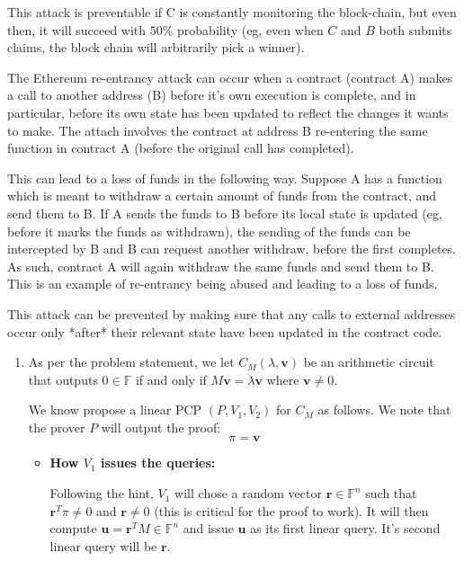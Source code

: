 \documentclass[12pt]{exam}
\newcommand{\Q}[1]{\question{\large{\textbf{#1}}}}
\begin{document}
\begin{questions}
\begin{solution}
  This attack is preventable if C is constantly monitoring the block-chain, but even then, it will succeed with $50\%$ probability (eg, even when $C$ and $B$ both submits claims, the block chain will arbitrarily pick a winner).
\end{solution}

\newpage
\Q{Problem 3}
\begin{solution}
  The Ethereum re-entrancy attack can occur when a contract (contract A) makes a call to another address (B) before it's own execution is complete, and in particular, before its own state has been updated to reflect the changes it wants to make. The attach involves the contract at address B re-entering the same function in contract A (before the original call has completed).

  This can lead to a loss of funds in the following way. Suppose A has a function which is meant to withdraw a certain amount of funds from the contract, and send them to B. If A sends the funds to B before its local state is updated (eg, before it marks the funds as withdrawn), the sending of the funds can be intercepted by B and B can request another withdraw, before the first completes. As such, contract A will again withdraw the same funds and send them to B. This is an example of re-entrancy being abused and leading to a loss of funds.

  This attack can be prevented by making sure that any calls to external addresses occur only *after* their relevant state have been updated in the contract code.
\end{solution}

\newpage
\Q{Problem 4}
\begin{solution}
  \begin{enumerate}[label=\textbf{\alph*.}]
    \item As per the problem statement, we let $C_M(\lambda, \textbf{v})$ be an arithmetic circuit that outputs $0 \in \mathbb{F}$ if and only if $M\textbf{v} = \lambda \textbf{v}$ where $\textbf{v} \neq 0$.

    We know propose a linear PCP $(P, V_1, V_2)$ for $C_M$ as follows. We note that the prover $P$ will output the proof:
      \[
        \pi = \textbf{v}
      \]
    \begin{itemize}
      \item 

      \textbf{How $V_1$ issues the queries:}

      Following the hint, $V_1$ will chose a random vector $\textbf{r} \in \mathbb{F}^n$ such that $\textbf{r}^T \pi \neq 0$ and $\textbf{r} \neq 0$ (this is critical for the proof to work). It will then compute $\textbf{u} = \textbf{r}^TM \in \mathbb{F}^n$ and issue $\textbf{u}$ as its first linear query. It's second linear query will be $\textbf{r}$.


\end{itemize}
\end{enumerate}
\end{solution}
\end{questions}
\end{document}
